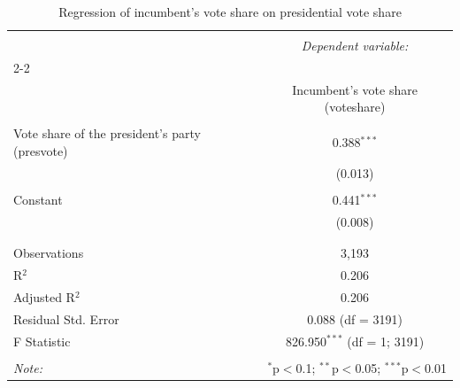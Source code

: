 
\begin{table}[H] \centering 
  \caption{Regression of incumbent's vote share on presidential vote share} 
  \label{tab:regression_q3} 
\begin{tabular}{@{\extracolsep{5pt}}lc} 
\\[-1.8ex]\hline 
\hline \\[-1.8ex] 
 & \multicolumn{1}{c}{\textit{Dependent variable:}} \\ 
\cline{2-2} 
\\[-1.8ex] & Incumbent's vote share (voteshare) \\ 
\hline \\[-1.8ex] 
 Vote share of the president's party (presvote) & 0.388$^{***}$ \\ 
  & (0.013) \\ 
  & \\ 
 Constant & 0.441$^{***}$ \\ 
  & (0.008) \\ 
  & \\ 
\hline \\[-1.8ex] 
Observations & 3,193 \\ 
R$^{2}$ & 0.206 \\ 
Adjusted R$^{2}$ & 0.206 \\ 
Residual Std. Error & 0.088 (df = 3191) \\ 
F Statistic & 826.950$^{***}$ (df = 1; 3191) \\ 
\hline 
\hline \\[-1.8ex] 
\textit{Note:}  & \multicolumn{1}{r}{$^{*}$p$<$0.1; $^{**}$p$<$0.05; $^{***}$p$<$0.01} \\ 
\end{tabular} 
\end{table}  
